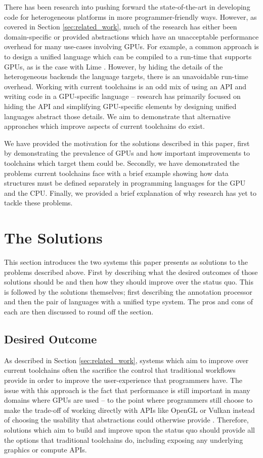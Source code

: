 \documentclass[a4paper,12pt,twoside,openright]{report}
\begin{document}
There has been research into pushing forward the state-of-the-art in developing
code for heterogeneous platforms in more programmer-friendly ways. However, as
covered in Section \ref{sec:related_work}, much of the research has either been
domain-specific or provided abstractions which have an unacceptable performance
overhead for many use-cases involving GPUs. For example, a common approach is
to design a unified language which can be compiled to a run-time that supports
GPUs, as is the case with Lime \cite{Lime2010}. However, by hiding the details
of the heterogeneous backends the language targets, there is an unavoidable
run-time overhead. Working with current toolchains is an odd mix of using an
API and writing code in a GPU-specific language -- research has primarily
focused on hiding the API and simplifying GPU-specific elements by designing
unified languages abstract those details. We aim to demonstrate that
alternative approaches which improve aspects of current toolchains do exist.

We have provided the motivation for the solutions described in this paper,
first by demonstrating the prevalence of GPUs and how important improvements to
toolchains which target them could be. Secondly, we have demonstrated the
problems current toolchains face with a brief example showing how data
structures must be defined separately in programming languages for the GPU and
the CPU. Finally, we provided a brief explanation of why research has yet to
tackle these problems.

\section{The Solutions}

\label{sec:solutions_introduction}

This section introduces the two systems this paper presents as solutions to the
problems described above. First by describing what the desired outcomes of
those solutions should be and then how they should improve over the status quo.
This is followed by the solutions themselves; first describing the annotation
processor and then the pair of languages with a unified type system. The pros
and cons of each are then discussed to round off the section.

\subsection{Desired Outcome}

As described in Section \ref{sec:related_work}, systems which aim to improve
over current toolchains often the sacrifice the control that traditional
workflows provide in order to improve the user-experience that programmers
have. The issue with this approach is the fact that performance is still
important in many domains where GPUs are used -- to the point where programmers
still choose to make the trade-off of working directly with APIs like OpenGL or
Vulkan instead of choosing the usability that abstractions could otherwise
provide \cite{TODO}. Therefore, solutions which aim to build and improve upon
the status quo should provide all the options that traditional toolchains do,
including exposing any underlying graphics or compute APIs.
\end{document}
